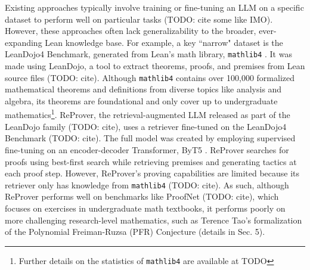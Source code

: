 \documentclass{article} %
\begin{document}
Existing approaches typically involve training or fine-tuning an LLM on a specific dataset to perform well on particular tasks (TODO: cite some like IMO). However, these approaches often lack generalizability to the broader, ever-expanding Lean knowledge base. For example, a key ``narrow" dataset is the LeanDojo4 Benchmark, generated from Lean's math library, \texttt{mathlib4} \citep{communityLeanprovercommunityMathlib42024}. It was made using LeanDojo, a tool to extract theorems, proofs, and premises from Lean source files (TODO: cite). Although \texttt{mathlib4} contains over 100,000 formalized mathematical theorems and definitions from diverse topics like analysis and algebra, its theorems are foundational and only cover up to undergraduate mathematics\footnote{Further details on the statistics of \texttt{mathlib4} are available at TODO}. ReProver, the retrieval-augmented LLM released as part of the LeanDojo family (TODO: cite), uses a retriever fine-tuned on the LeanDojo4 Benchmark (TODO: cite). The full model was created by employing supervised fine-tuning on an encoder-decoder Transformer, ByT5 \citep{xueByT5TokenFreeFuture2022}. ReProver searches for proofs using best-first search while retrieving premises and generating tactics at each proof step. However, ReProver's proving capabilities are limited because its retriever only has knowledge from \texttt{mathlib4} (TODO: cite). As such, although ReProver performs well on benchmarks like ProofNet (TODO: cite), which focuses on exercises in undergraduate math textbooks, it performs poorly on more challenging research-level mathematics, such as Terence Tao's formalization of the Polynomial Freiman-Ruzsa (PFR) Conjecture (details in Sec. 5).
\end{document}

